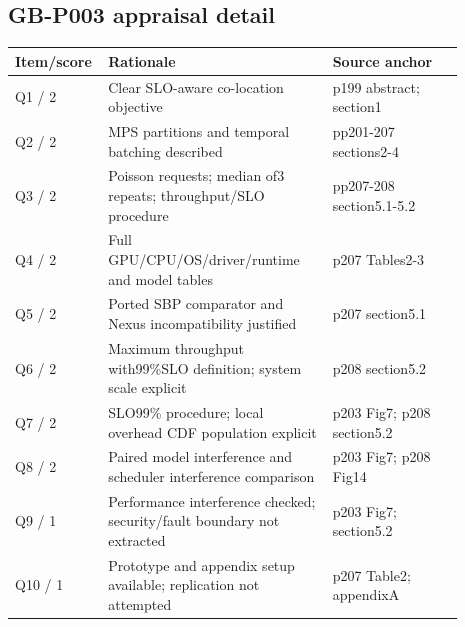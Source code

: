 \documentclass[12pt,a4paper]{article}
\begin{document}
\subsection{GB-P003 appraisal detail}
\begin{longtable}{p{0.13\linewidth}p{0.48\linewidth}p{0.28\linewidth}}
\toprule
Item/\allowbreak{}score & Rationale & Source anchor\\\midrule
\endhead
Q1 /\allowbreak{} 2 & Clear SLO-aware co-location objective & p199 abstract; section1\\
Q2 /\allowbreak{} 2 & MPS partitions and temporal batching described & pp201-207 sections2-4\\
Q3 /\allowbreak{} 2 & Poisson requests; median of3 repeats; throughput/\allowbreak{}SLO procedure & pp207-208 section5.1-5.2\\
Q4 /\allowbreak{} 2 & Full GPU/\allowbreak{}CPU/\allowbreak{}OS/\allowbreak{}driver/\allowbreak{}runtime and model tables & p207 Tables2-3\\
Q5 /\allowbreak{} 2 & Ported SBP comparator and Nexus incompatibility justified & p207 section5.1\\
Q6 /\allowbreak{} 2 & Maximum throughput with99\%SLO definition; system scale explicit & p208 section5.2\\
Q7 /\allowbreak{} 2 & SLO99\% procedure; local overhead CDF population explicit & p203 Fig7; p208 section5.2\\
Q8 /\allowbreak{} 2 & Paired model interference and scheduler interference comparison & p203 Fig7; p208 Fig14\\
Q9 /\allowbreak{} 1 & Performance interference checked; security/\allowbreak{}fault boundary not extracted & p203 Fig7; section5.2\\
Q10 /\allowbreak{} 1 & Prototype and appendix setup available; replication not attempted & p207 Table2; appendixA\\
\bottomrule
\end{longtable}
\end{document}
